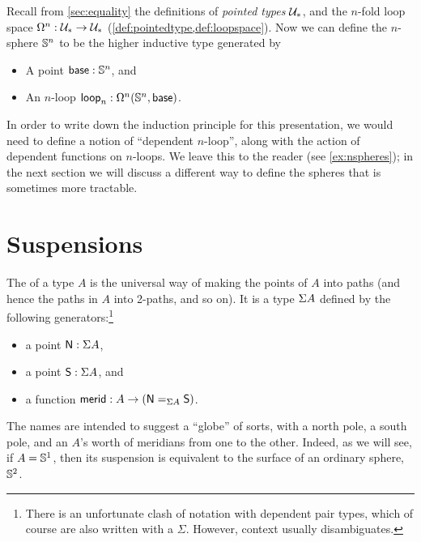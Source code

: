%
Recall from \cref{sec:equality} the definitions of \emph{pointed types} $\type_*$, and the $n$-fold loop space $\Omega^n : \type_* \to \type_*$
(\cref{def:pointedtype,def:loopspace}).  Now we can define the
$n$-sphere $\Sn^n$ to be the higher inductive type generated by
%
\begin{itemize}
\item A point $\base:\Sn^n$, and
\item An $n$-loop $\lloop_n : \Omega^n(\Sn^n,\base)$.
\end{itemize}
In order to write down the induction principle for this presentation, we would need to define a notion of ``dependent $n$-loop'', along with the action of dependent functions on $n$-loops.
We leave this to the reader (see \cref{ex:nspheres}); in the next section we will discuss a different way to define the spheres that is sometimes more tractable.


\section{Suspensions}
\label{sec:suspension}

%
%
The  of a type $A$ is the universal way of making the points of $A$ into paths (and hence the paths in $A$ into 2-paths, and so on).
It is a type $\susp A$ defined by the following generators:\footnote{There is an unfortunate clash of notation with dependent pair types, which of course are also written with a $\Sigma$.
  However, context usually disambiguates.}
\begin{itemize}
\item a point $\north:\susp A$,
\item a point $\south:\susp A$, and
\item a function $\merid:A \to (\id[\susp A]\north\south)$.
\end{itemize}
The names are intended to suggest a ``globe'' of sorts, with a north pole, a south pole, and an $A$'s worth of meridians
%
%
from one to the other.
Indeed, as we will see, if $A=\Sn^1$, then its suspension is equivalent to the surface of an ordinary sphere, $\Sn^2$.

